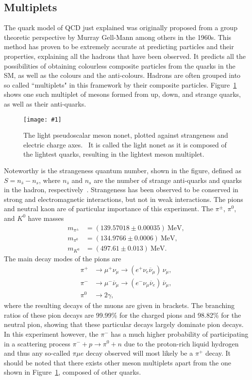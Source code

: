 \documentclass[twocolumn]{article}
\newcommand{\insertFigure}[1]{%
   \texttt{[image: \#1]}%
}
\begin{document}
\subsection{Multiplets}
The quark model of QCD just explained was originally proposed from a group theoretic perspective by Murray Gell-Mann among others in the 1960s. This method has proven to be extremely accurate at predicting particles and their properties, explaining all the hadrons that have been observed. It predicts all the possibilities of obtaining colourless composite particles from the quarks in the SM, as well as the colours and the anti-colours. Hadrons are often grouped into so called ``multiplets" in this framework by their composite particles. Figure~\ref{fig:pseudo} shows one such multiplet of mesons formed from up, down, and strange quarks, as well as their anti-quarks. 
\begin{figure}[!h]
	\centering
	\insertFigure{pseudo.png}
	\caption{The light pseudoscalar meson nonet, plotted against strangeness and electric charge axes.~\cite{pseudo} It is called the light nonet as it is composed of the lightest quarks, resulting in the lightest meson multiplet.}
	\label{fig:pseudo}
\end{figure}
Noteworthy is the strangeness quantum number, shown in the figure, defined as $S = n_{\bar{s}} - n_s$, where $n_{\bar{s}}$ and $n_s$ are the number of strange anti-quarks and quarks in the hadron, respectively~\cite{Thompson}. Strangeness has been observed to be conserved in strong and electromagnetic interactions, but not in weak interactions. The pions and neutral kaon are of particular importance of this experiment. The $\pi^{\pm}$, $\pi^0$, and $K^0$ have masses~\cite{pdg}
\begin{align*} %
m_{\pi^{\pm}} &= (139.57018 \pm 0.00035)~\text{MeV}, \\
m_{\pi^0} &= (134.9766 \pm 0.0006)~\text{MeV}, \\
m_{K^0} & = (497.61 \pm 0.013)~\text{MeV}.
\end{align*}
The main decay modes of the pions are 
\begin{align*} %
\pi^+ &\to \mu^+ \nu_\mu \to (e^+ \nu_e \overline{\nu}_{\mu}) \, \nu_\mu, \\
\pi^- &\to \mu^- \overline{\nu}_\mu \to (e^- \nu_\mu \overline{\nu}_e) \, \overline{\nu}_\mu , \\
\pi^0 &\to 2\gamma,
\end{align*}
where the resulting decays of the muons are given in brackets. The branching ratios of these pion decays are 99.99\% for the charged pions and 98.82\% for the neutral pion, showing that these particular decays largely dominate pion decays.~\cite{pdg} In this experiment however, the $\pi^-$ has a much higher probability of participating in a scattering process $\pi^- +p\to \pi^0+n$ due to the proton-rich liquid hydrogen and thus any so-called $\pi \mu e$ decay observed will most likely be a $\pi^+$ decay. It should be noted that there exists other meson multiplets apart from the one shown in Figure~\ref{fig:pseudo}, composed of other quarks.\\
\end{document}
